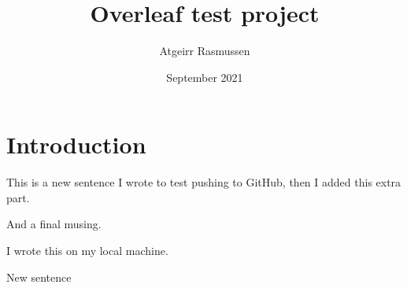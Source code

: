 \documentclass{article}
\title{Overleaf test project}
\author{Atgeirr Rasmussen}
\date{September 2021}
\begin{document}
\maketitle

\section{Introduction}

This is a new sentence I wrote to test pushing to GitHub, then I added this extra part.

And a final musing.


I wrote this on my local machine.


New sentence
\end{document}
